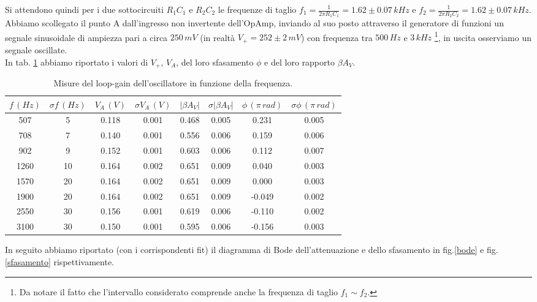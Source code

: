 \documentclass[10pt,a4paper]{article}
\begin{document}
Si attendono quindi per i due sottocircuiti $R_1 C_1$ e $R_2 C_2$ le frequenze di taglio $f_1=\frac{1}{2 \pi R_1C_1} = 1.62 \pm 0.07 \, kHz $ e $f_2=\frac{1}{2 \pi R_2C_2} = 1.62 \pm 0.07 \, kHz$.\\

Abbiamo scollegato il punto A dall'ingresso non invertente dell'OpAmp, inviando al suo posto attraverso il generatore di funzioni un segnale sinusoidale di ampiezza pari a circa $250\,mV$ (in realtà $V_{+} = 252 \pm 2 \, mV$) con frequenza tra $500\,Hz$ e $3\,kHz$ \footnote{Da notare il fatto che l'intervallo considerato comprende anche la frequenza di taglio $f_1 \sim f_2$.}, in uscita osserviamo un segnale oscillate.\\
In tab. \ref{tabella} abbiamo riportato i valori di $V_+$, $V_A$, del loro sfasamento $\phi$ e del loro rapporto $\beta A_V$.\\

\begin{table}[!htb]
\centering
\begin{tabular}{|c|c|c|c|c|c|c|c|}
\hline
$f\,(Hz)$ & $ \sigma f \, (Hz)$ & $V_A \, (V)$ & $\sigma V_A \, (V)$ & $\vert \beta A_V \vert$ & $\sigma \vert \beta A_V \vert$ & $ \phi \, ( \pi \, rad)$ & $ \sigma \phi \, ( \pi \, rad)$\\
\hline
507 & 5 & 0.118 & 0.001 & 0.468 & 0.005 & 0.231 & 0.005\\
708 & 7 & 0.140 & 0.001 & 0.556 & 0.006 & 0.159 & 0.006\\
902 & 9 & 0.152 & 0.001 & 0.603 & 0.006 & 0.112 & 0.007\\
1260 & 10 & 0.164 & 0.002 & 0.651 & 0.009 & 0.040 & 0.003\\
1570 & 20 & 0.164 & 0.002 & 0.651 & 0.009 & 0.000 & 0.003\\
1900 & 20 & 0.164 & 0.002 & 0.651 & 0.009 & -0.049 & 0.002\\
2550 & 30 & 0.156 & 0.001 & 0.619 & 0.006 & -0.110 & 0.002\\
3100 & 30 & 0.150 & 0.001 & 0.595 & 0.006 & -0.156 & 0.003\\
\hline
\end{tabular}
\label{tabella}
\caption{Misure del loop-gain dell'oscillatore in funzione della frequenza.}
\end{table}

In seguito abbiamo riportato (con i corrispondenti fit) il diagramma di Bode dell'attenuazione e dello sfasamento in fig.\ref{bode} e fig.\ref{sfasamento} rispettivamente.\\
\end{document}
